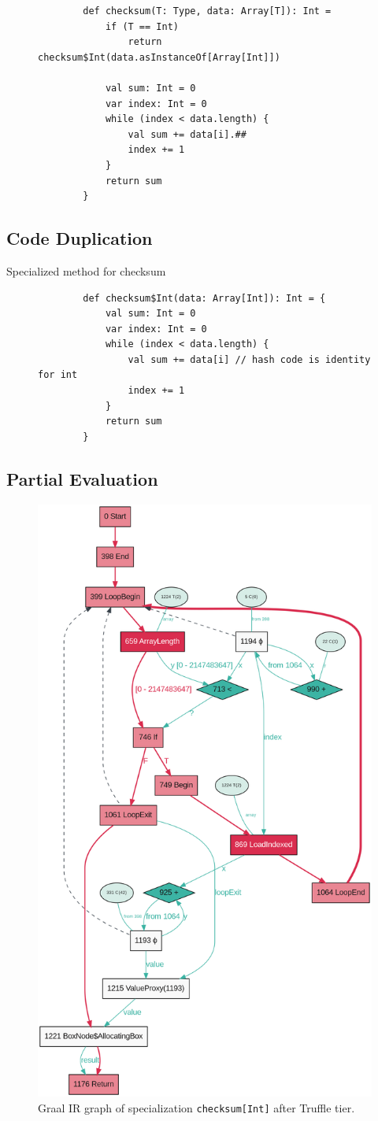 \begin{figure}[H]
	\begin{verbatim}
		def checksum(T: Type, data: Array[T]): Int = 
			if (T == Int)
				return checksum$Int(data.asInstanceOf[Array[Int]])
			 
			val sum: Int = 0
			var index: Int = 0
			while (index < data.length) {
				val sum += data[i].##
				index += 1
			}
			return sum	
		}
	\end{verbatim}
\end{figure}

\subsection{Code Duplication}

Specialized method for checksum
\begin{figure}[H]
	\begin{verbatim}
		def checksum$Int(data: Array[Int]): Int = {
			val sum: Int = 0
			var index: Int = 0
			while (index < data.length) {
				val sum += data[i] // hash code is identity for int
				index += 1
			}
			return sum	
		}
	\end{verbatim}
\end{figure}


\subsection{Partial Evaluation}


\begin{figure}
	\centering
	\includegraphics[width=0.5\columnwidth]{figures/checksum:Int:TruffleTier.png}
	\caption{Graal IR graph of specialization \texttt{checksum[Int]} after Truffle tier.}
\end{figure} 